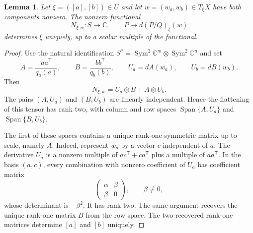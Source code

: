 \documentclass[11pt]{article}
\newtheorem{lemma}[theorem]{Lemma}
\newcommand{\C}{\mathbb C}
\DeclareMathOperator{\Sym}{Sym}
\DeclareMathOperator{\Span}{Span}
\begin{document}
\begin{lemma}\label{lem:recover}
Let $\xi=([a],[b])\in U$ and let $w=(w_a,w_b)\in T_\xi X$ have both
components nonzero. The nonzero functional
\[
 N_{\xi,w}:S\longrightarrow\C,\qquad
 P\longmapsto d(P/Q)_\xi(w)
\]
determines $\xi$ uniquely, up to a scalar multiple of the functional.
\end{lemma}
\begin{proof}
Use the natural identification
$S^*=\Sym^2\C^m\otimes\Sym^2\C^n$ and set
\[
 A=\frac{aa^{\mathsf T}}{q_a(a)},\qquad
 B=\frac{bb^{\mathsf T}}{q_b(b)},\qquad
 U_a=dA(w_a),\qquad U_b=dB(w_b).
\]
Then
\begin{equation}\label{eq:normal}
 N_{\xi,w}=U_a\otimes B+A\otimes U_b.
\end{equation}
The pairs $(A,U_a)$ and $(B,U_b)$ are linearly independent. Hence the
flattening of this tensor has rank two, with column and row spaces
$\Span\{A,U_a\}$ and $\Span\{B,U_b\}$.

The first of these spaces contains a unique rank-one symmetric matrix
up to scale, namely $A$. Indeed, represent $w_a$ by a vector $c$
independent of $a$. The derivative $U_a$ is a nonzero multiple of
$ac^{\mathsf T}+ca^{\mathsf T}$ plus a multiple of $aa^{\mathsf T}$.
In the basis $(a,c)$, every combination with nonzero coefficient of
$U_a$ has coefficient matrix
\[
 \begin{pmatrix}\alpha&\beta\\\beta&0\end{pmatrix},\qquad\beta\ne0,
\]
whose determinant is $-\beta^2$. It has rank two. The same argument
recovers the unique rank-one matrix $B$ from the row space. The two
recovered rank-one matrices determine $[a]$ and $[b]$ uniquely.
\end{proof}
\end{document}
